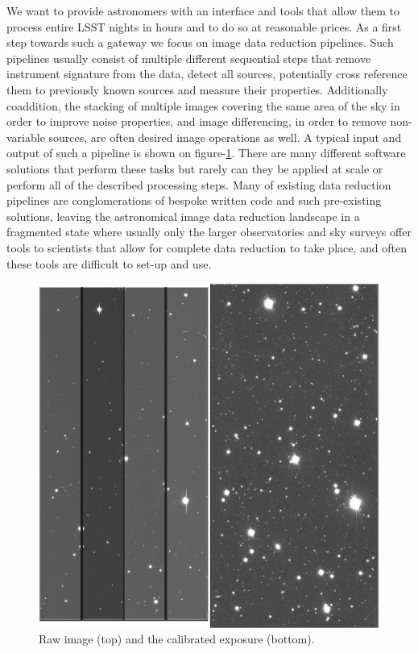 \documentclass[a4paper, 10pt, conference]{ieeeconf}
\begin{document}
We want to provide astronomers with an interface and tools that allow them to process entire LSST nights in hours and to do so at reasonable prices. As a first step towards such a gateway we focus on image data reduction pipelines. Such pipelines usually consist of multiple different sequential steps that remove instrument signature from the data, detect all sources, potentially cross reference them to previously known sources and measure their properties. Additionally coaddition, the stacking of multiple images covering the same area of the sky in order to improve noise properties, and image differencing, in order to remove non-variable sources, are often desired image operations as well. A typical input and output of such a pipeline is shown on figure-\ref{fig:raw2calexp}. There are many different software solutions that perform these tasks but rarely can they be applied at scale or perform all of the described processing steps. Many of existing data reduction pipelines are conglomerations of bespoke written code and such pre-existing solutions, leaving the astronomical image data reduction landscape in a fragmented state where usually only the larger observatories and sky surveys offer tools to scientists that allow for complete data reduction to take place, and often these tools are difficult to set-up and use. 

\begin{figure}[htb]
\centering
\includegraphics[angle=-90,width=0.8\columnwidth]{figures/raw2calexp.png}
\caption{Raw image (top) and the calibrated exposure (bottom).}
\label{fig:raw2calexp}
\end{figure}
\end{document}
